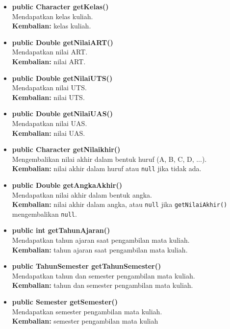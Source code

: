 \begin{enumerate}
\begin{enumerate}
\begin{itemize}
			\item \textbf{public Character getKelas()}\\
				Mendapatkan kelas kuliah.\\
				\textbf{Kembalian:} kelas kuliah.
				
			\item \textbf{public Double getNilaiART()}\\
				Mendapatkan nilai ART.\\
				\textbf{Kembalian:} nilai ART.
				
			\item \textbf{public Double getNilaiUTS()}\\
				Mendapatkan nilai UTS.\\
				\textbf{Kembalian:} nilai UTS.
				
			\item \textbf{public Double getNilaiUAS()}\\
				Mendapatkan nilai UAS.\\
				\textbf{Kembalian:} nilai UAS.
				
			\item \textbf{public Character getNilaikhir()}\\
				Mengembalikan nilai akhir dalam bentuk huruf (A, B, C, D, ...).\\
				\textbf{Kembalian:} nilai akhir dalam huruf atau \texttt{null} jika tidak ada.
			
			\item \textbf{public Double getAngkaAkhir()}\\
				Mendapatkan nilai akhir dalam bentuk angka.\\
				\textbf{Kembalian:} nilai akhir dalam angka, atau \texttt{null} jika \texttt{getNilaiAkhir()} mengembalikan \texttt{null}.
			
			\item \textbf{public int getTahunAjaran()}\\
				Mendapatkan tahun ajaran saat pengambilan mata kuliah.\\
				\textbf{Kembalian:} tahun ajaran saat pengambilan mata kuliah.
			
			\item \textbf{public TahunSemester getTahunSemester()}\\
				Mendapatkan tahun dan semester pengambilan mata kuliah.\\
				\textbf{Kembalian:} tahun dan semester pengambilan mata kuliah.	
				
			\item \textbf{public Semester getSemester()}\\
				Mendapatkan semester pengambilan mata kuliah.\\
				\textbf{Kembalian:} semester pengambilan mata kuliah
		\end{itemize}
		

\end{enumerate}
\end{enumerate}
